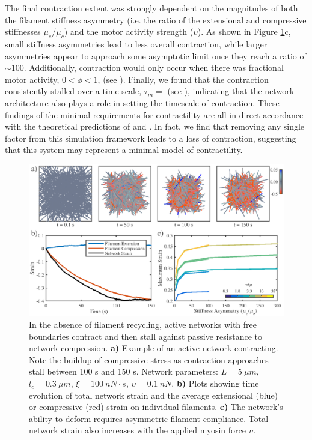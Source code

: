 \documentclass[10pt,letterpaper]{article}
\begin{document}
The final contraction extent was strongly dependent on the magnitudes of both the filament stiffness asymmetry (i.e. the ratio of the extensional and compressive stiffnesses $\mu_e/\mu_c$) and the motor activity strength ($\upsilon$).  As shown in Figure \ref{fig:active_con}c, small stiffness asymmetries lead to less overall contraction, while larger asymmetries appear to approach some asymptotic limit once they reach a ratio of $\sim 100$.  Additionally, contraction would only occur when there was fractional motor activity, $0<\phi<1$, (see ).  Finally, we found that the contraction consistently stalled over a time scale, $\tau_m=$ (see ), indicating that the network architecture also plays a role in setting the timescale of contraction.  These findings of the minimal requirements for contractility are all in direct accordance with the theoretical predictions of \cite{1367-2630-14-3-033037} and \cite{PhysRevX.4.041002}.  In fact, we find that removing any single factor from this simulation framework leads to a loss of contraction, suggesting that this system may represent a minimal model of contractility. 

\begin{figure}[h!]
	\centering
	\includegraphics[width=\hsize]{figures/figure4a}
	\caption{\label{fig:active_con} In the absence of filament recycling, active networks with free boundaries contract and then stall against passive resistance to network compression. \textbf{a)}  Example of an active network contracting. Note the buildup of compressive stress as contraction approaches stall between 100 s and 150 s.  Network parameters: $L=5\: \mu m$, $l_c=0.3\: \mu m$, $\xi=100\: nN\cdot s$, $\upsilon=0.1\: nN$.  \textbf{b)} Plots showing time evolution of total network strain and  the average extensional (blue) or compressive (red) strain on individual filaments.   \textbf{c)} The network's ability to deform requires asymmetric filament compliance.  Total network strain also increases with the applied myosin force $\upsilon$.}
\end{figure}
\end{document}
